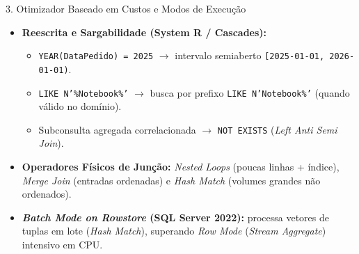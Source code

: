 \documentclass[aspectratio=169,11pt]{beamer}
\begin{document}
\begin{frame}{3. Otimizador Baseado em Custos e Modos de Execução}
  \begin{itemize}
    \item \textbf{Reescrita e Sargabilidade (System R / Cascades):}
      \begin{itemize}
        \item \texttt{YEAR(DataPedido) = 2025} $\rightarrow$ intervalo semiaberto \texttt{[2025-01-01, 2026-01-01)}.
        \item \texttt{LIKE N'\%Notebook\%'} $\rightarrow$ busca por prefixo \texttt{LIKE N'Notebook\%'} (quando válido no domínio).
        \item Subconsulta agregada correlacionada $\rightarrow$ \texttt{NOT EXISTS} (\textit{Left Anti Semi Join}).
      \end{itemize}
    \item \textbf{Operadores Físicos de Junção:} \textit{Nested Loops} (poucas linhas + índice), \textit{Merge Join} (entradas ordenadas) e \textit{Hash Match} (volumes grandes não ordenados).
    \item \textbf{\textit{Batch Mode on Rowstore} (SQL Server 2022):} processa vetores de tuplas em lote (\textit{Hash Match}), superando \textit{Row Mode} (\textit{Stream Aggregate}) intensivo em CPU.
  \end{itemize}
\end{frame}
\end{document}
